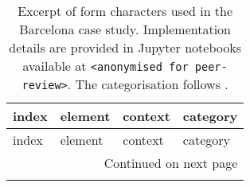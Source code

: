 \small
\begin{longtable}{p{5cm}p{4cm}p{4cm}l}
\caption{Excerpt of form characters used in the Barcelona case study. Implementation details are provided
in Jupyter notebooks available at \texttt{<anonymised for peer-review>}. The categorisation follows \cite{fleischmann2020measuring}.}
\label{tab:bcn_form_excerpt} \\
\toprule
                               index &                         element &                    context &     category \\
\midrule
\endfirsthead

\toprule
                               index &                         element &                    context &     category \\
\midrule
\endhead
\midrule
\multicolumn{4}{r}{{Continued on next page}} \\
\midrule
\endfoot


\end{longtable}
